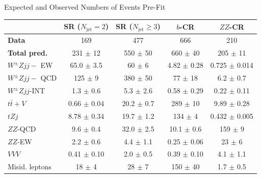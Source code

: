 \documentclass{beamer}
\newcommand{\wzjjew}{$W^\pm Z jj-$ EW}
\newcommand{\wzjjqcd}{$W^\pm Z jj-$ QCD}
\newcommand{\wzjj}{$W^\pm Z jj$}
\begin{document}
\begin{frame}[noframenumbering]{Expected and Observed Numbers of Events Pre-Fit}
    \begin{table}[htbp] 
    \centering
    \footnotesize %
    \renewcommand{\arraystretch}{1.2} %
    \begin{tabular}{l c c c c}
    \hline
     & \textbf{SR ($N_{\text{jet}} = 2$)} & \textbf{SR ($N_{\text{jet}} \ge 3$)} & \textbf{$b$-CR} & \textbf{$ZZ$-CR} \\
    \hline
    \hline
    \textbf{Data} & 169 & 477 & 666 & 210 \\
    \textbf{Total pred.} & 231 $\pm$ 12 & 550 $\pm$ 50 & 660 $\pm$ 40 & 205 $\pm$ 11 \\
    \hline
    \wzjjew & 65.0 $\pm$ 3.5 & 60 $\pm$ 6 & 4.82 $\pm$ 0.28 & 0.725 $\pm$ 0.014 \\
    \wzjjqcd & 125 $\pm$ 9 & 380 $\pm$ 50 & 77 $\pm$ 18 & 6.2 $\pm$ 0.7 \\
    \wzjj-INT & 1.3 $\pm$ 0.6 & 5.3 $\pm$ 2.6 & 0.58 $\pm$ 0.29 & 0.22 $\pm$ 0.11 \\
    $t\bar{t}+V$ & 0.66 $\pm$ 0.04 & 20.2 $\pm$ 0.7 & 289 $\pm$ 10 & 9.89 $\pm$ 0.28 \\
    $tZj$ & 8.78 $\pm$ 0.34 & 19.7 $\pm$ 1.2 & 134 $\pm$ 4 & 0.432 $\pm$ 0.005 \\
    $ZZ$-QCD & 9.6 $\pm$ 0.4 & 32.0 $\pm$ 2.5 & 10.1 $\pm$ 0.6 & 159 $\pm$ 9 \\
    $ZZ$-EW & 2.2 $\pm$ 0.6 & 4.4 $\pm$ 1.1 & 0.25 $\pm$ 0.06 & 23 $\pm$ 6 \\
    $VVV$ & 0.41 $\pm$ 0.10 & 2.0 $\pm$ 0.5 & 0.39 $\pm$ 0.10 & 4.1 $\pm$ 1.1 \\
    Misid. leptons & 18 $\pm$ 4 & 28 $\pm$ 7 & 150 $\pm$ 40 & 1.7 $\pm$ 0.5 \\
    \hline
    \end{tabular}
    \label{tab:VBSyield_prefit}
    \end{table}
\end{frame}
\end{document}
